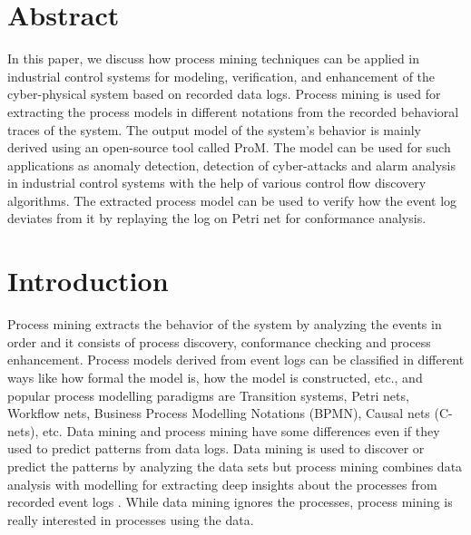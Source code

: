 \begin{bibunit}
\thispagestyle{plain}

\newcommand \op[1] {\ensuremath{\operatorname{\mathbf{#1}}}}
\newcommand \com[1] {\ensuremath{\mathtt{#1}}}
\newcommand{\RNum}[1]{\uppercase\expandafter{\romannumeral #1\relax}}

\section*{Abstract}
	In this paper, we discuss how process mining techniques can be applied in industrial control systems for modeling, verification, and enhancement of the cyber-physical system based on recorded data logs. Process mining is used for extracting the process models in different notations from the recorded behavioral traces of the system. The output model of the system’s behavior is mainly derived using an open-source tool called ProM. The model can be used for such applications as anomaly detection, detection of cyber-attacks and alarm analysis in industrial control systems with the help of various control flow discovery algorithms. The extracted process model can be used to verify how the event log deviates from it by replaying the log on Petri net for conformance analysis.
	
	\section{Introduction}
 
	Process mining \cite{van2012process1}  extracts the behavior of the system by analyzing the events in order and it consists of process discovery, conformance checking and process enhancement. Process models derived from event logs can be classified in different ways like how formal the model is, how the model is constructed, etc., and popular process modelling paradigms are Transition systems, Petri nets, Workflow nets, Business Process Modelling Notations (BPMN), Causal nets (C-nets),  etc. Data mining and process mining have some differences even if they used to predict patterns from data logs. Data mining is used to discover or predict the patterns by analyzing the data sets but process mining combines data analysis with modelling for extracting deep insights about the processes from recorded event logs  \cite{van2016process}. While data mining ignores the processes, process mining is really interested in processes using the data.
	

\end{bibunit}
